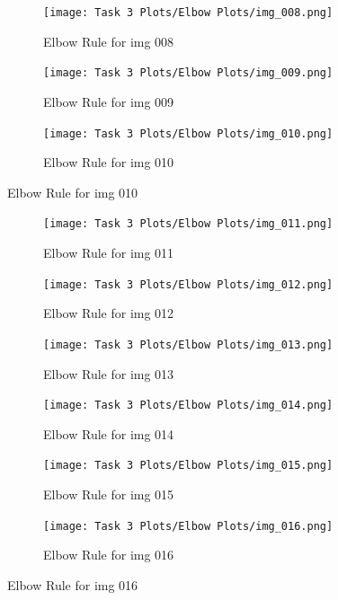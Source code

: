 \documentclass[11pt]{report}
\begin{document}
\begin{figure}[H]
\begin{subfigure}{0.3\textwidth}
        \texttt{[image: Task 3 Plots/Elbow Plots/img\_008.png]}
        \caption{Elbow Rule for img 008}
        \label{fig:elbow8}
    \end{subfigure}
    \begin{subfigure}{0.3\textwidth}
        \centering
        \texttt{[image: Task 3 Plots/Elbow Plots/img\_009.png]}
        \caption{Elbow Rule for img 009}
        \label{fig:elbow9}
    \end{subfigure}
    \begin{subfigure}{0.3\textwidth}
        \centering
        \texttt{[image: Task 3 Plots/Elbow Plots/img\_010.png]}
        \caption{Elbow Rule for img 010}
        \label{fig:elbow10}
    \end{subfigure}
\end{figure}
\begin{figure}[H] \ContinuedFloat
    \centering
    \begin{subfigure}{0.3\textwidth}
        \centering
        \texttt{[image: Task 3 Plots/Elbow Plots/img\_011.png]}
        \caption{Elbow Rule for img 011}
        \label{fig:elbow11}
    \end{subfigure}
    \begin{subfigure}{0.3\textwidth}
        \centering
        \texttt{[image: Task 3 Plots/Elbow Plots/img\_012.png]}
        \caption{Elbow Rule for img 012}
        \label{fig:elbow12}
    \end{subfigure}
    \begin{subfigure}{0.3\textwidth}
        \centering
        \texttt{[image: Task 3 Plots/Elbow Plots/img\_013.png]}
        \caption{Elbow Rule for img 013}
        \label{fig:elbow13}
    \end{subfigure}
    \begin{subfigure}{0.3\textwidth}
        \centering
        \texttt{[image: Task 3 Plots/Elbow Plots/img\_014.png]}
        \caption{Elbow Rule for img 014}
        \label{fig:elbow14}
    \end{subfigure}
    \begin{subfigure}{0.3\textwidth}
        \centering
        \texttt{[image: Task 3 Plots/Elbow Plots/img\_015.png]}
        \caption{Elbow Rule for img 015}
        \label{fig:elbow15}
    \end{subfigure}
    \begin{subfigure}{0.3\textwidth}
        \centering
        \texttt{[image: Task 3 Plots/Elbow Plots/img\_016.png]}
        \caption{Elbow Rule for img 016}
        \label{fig:elbow16}
    \end{subfigure}

\end{figure}
\end{document}
